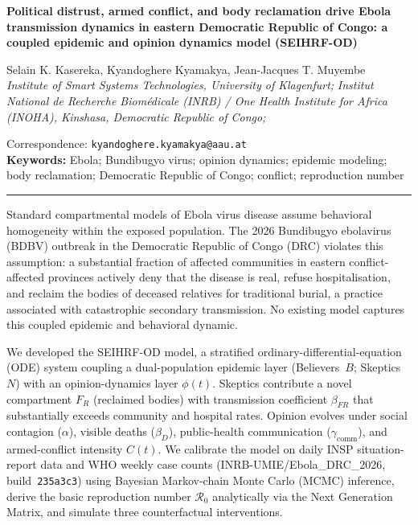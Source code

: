 \documentclass[12pt,a4paper]{article}
\begin{document}
\begin{center}
{\Large\bfseries\color{lancetblue}
Political distrust, armed conflict, and body reclamation drive Ebola
transmission dynamics in eastern Democratic Republic of Congo: a
coupled epidemic and opinion dynamics model (SEIHRF-OD)
}

\vspace{1em}
{\normalsize\color{lancetgray}
Selain K. Kasereka, Kyandoghere Kyamakya, Jean-Jacques T. Muyembe
\\[2pt]

\emph{Institute of Smart Systems Technologies, University of Klagenfurt;}
\emph{Institut National de Recherche Biom\'{e}dicale (INRB) / One Health
  Institute for Africa (INOHA), Kinshasa, Democratic Republic of Congo;}
}

\vspace{0.4em}
{\small Correspondence: \texttt{kyandoghere.kyamakya@aau.at}}\\[4pt]{\small \textbf{Keywords:} Ebola; Bundibugyo virus; opinion dynamics; epidemic modeling; body reclamation; Democratic Republic of Congo; conflict; reproduction number}
\end{center}

\hrule\vspace{0.8em}


\smallskip{}
Standard compartmental models of Ebola virus disease assume behavioral
homogeneity within the exposed population. The 2026 Bundibugyo ebolavirus
(BDBV) outbreak in the Democratic Republic of Congo (DRC) violates this
assumption: a substantial fraction of affected communities in eastern
conflict-affected provinces actively deny that the disease is real, refuse
hospitalisation, and reclaim the bodies of deceased relatives for traditional
burial, a practice associated with catastrophic secondary transmission. No
existing model captures this coupled epidemic and behavioral dynamic.

\smallskip{}
We developed the SEIHRF-OD model, a stratified ordinary-differential-equation
(ODE) system coupling a dual-population epidemic layer (Believers~$B$;
Skeptics~$N$) with an opinion-dynamics layer $\phi(t)$. Skeptics contribute
a novel compartment $F_R$ (reclaimed bodies) with transmission coefficient
$\beta_{FR}$ that substantially exceeds community and hospital rates.
Opinion evolves under social contagion ($\alpha$), visible deaths ($\beta_D$),
public-health communication ($\gamma_{\text{comm}}$), and armed-conflict
intensity $C(t)$. We calibrate the model on daily INSP situation-report data
and WHO weekly case counts (INRB-UMIE/Ebola\_DRC\_2026, build~\texttt{235a3c3})
using Bayesian Markov-chain Monte Carlo (MCMC) inference, derive the basic
reproduction number $\mathcal{R}_0$ analytically via the Next Generation Matrix,
and simulate three counterfactual interventions.
\end{document}
